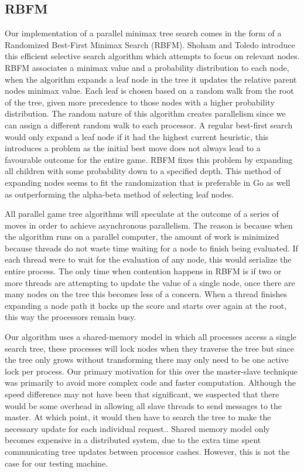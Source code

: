 \documentclass[conference]{IEEEtran}
\begin{document}
\subsection{RBFM}
Our implementation of a parallel minimax tree search comes in the form of a Randomized Best-First Minimax Search (RBFM). Shoham and Toledo introduce this efficient selective search algorithm which attempts to focus on relevant nodes. RBFM associates a minimax value and a probability distribution to each node, when the algorithm expands a leaf node in the tree it updates the relative parent nodes minimax value. Each leaf is chosen based on a random walk from the root of the tree, given more precedence to those nodes with a higher probability distribution. The random nature of this algorithm creates parallelism since we can assign a different random walk to each processor. A regular best-first search would only expand a leaf node if it had the highest current heuristic, this introduces a problem as the initial best move does not always lead to a favourable outcome for the entire game. RBFM fixes this problem by expanding all children with some probability down to a specified depth.  This method of expanding nodes seems to fit the randomization that is preferable in Go as well as outperforming the alpha-beta method of selecting leaf nodes.\par
All parallel game tree algorithms will speculate at the outcome of a series of moves in order to achieve asynchronous parallelism. The reason is because when the algorithm runs on a parallel computer, the amount of work is minimized because threads do not waste time waiting for a node to finish being evaluated. If each thread were to wait for the evaluation of any node, this would serialize the entire process. The only time when contention happens in RBFM is if two or more threads are attempting to update the value of a single node, once there are many nodes on the tree this becomes less of a concern. When a thread finishes expanding a node path it backs up the score and starts over again at the root, this way the processors remain busy.\par
Our algorithm uses a shared-memory model in which all processes access a single search tree, these processes will lock nodes when they traverse the tree but since the tree only grows without transforming there may only need to be one active lock per process. Our primary motivation for this over the master-slave technique was primarily to avoid more complex code and faster computation. Although the speed difference may not have been that significant, we suspected that there would be some overhead in allowing all slave threads to send messages to the master. At which point, it would then have to search the tree to make the necessary update for each individual request.. Shared memory model only becomes expensive in a distributed system, due to the extra time spent communicating tree updates between processor cashes. However, this is not the case for our testing machine.\par
\end{document}
